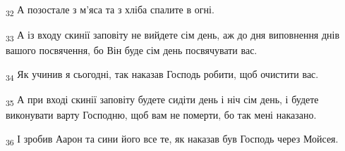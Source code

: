 \begin{tcolorbox}
\textsubscript{32} А позостале з м'яса та з хліба спалите в огні.
\end{tcolorbox}
\begin{tcolorbox}
\textsubscript{33} А із входу скинії заповіту не вийдете сім день, аж до дня виповнення днів вашого посвячення, бо Він буде сім день посвячувати вас.
\end{tcolorbox}
\begin{tcolorbox}
\textsubscript{34} Як учинив я сьогодні, так наказав Господь робити, щоб очистити вас.
\end{tcolorbox}
\begin{tcolorbox}
\textsubscript{35} А при вході скинії заповіту будете сидіти день і ніч сім день, і будете виконувати варту Господню, щоб вам не померти, бо так мені наказано.
\end{tcolorbox}
\begin{tcolorbox}
\textsubscript{36} І зробив Аарон та сини його все те, як наказав був Господь через Мойсея.
\end{tcolorbox}
